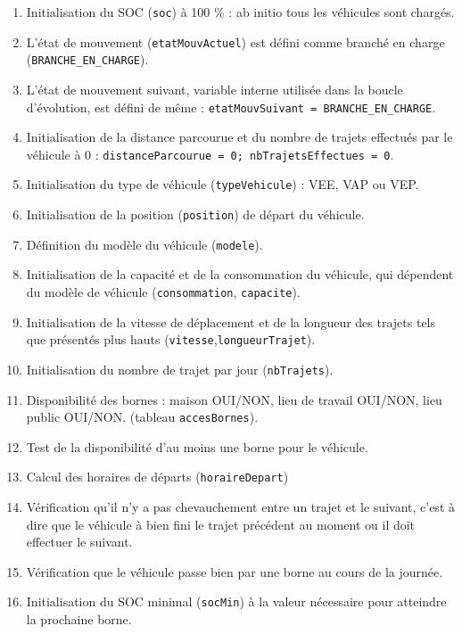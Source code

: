 			\begin{enumerate}
				\item Initialisation du SOC (\texttt{soc}) à 100 $\percent$ : ab initio tous les véhicules sont chargés.
				\item L'état de mouvement (\texttt{etatMouvActuel}) est défini comme branché en charge (\texttt{BRANCHE\_EN\_CHARGE}).
				\item L'état de mouvement suivant, variable interne utilisée dans la boucle d'évolution, est défini de même : \texttt{etatMouvSuivant = BRANCHE\_EN\_CHARGE}.
				\item Initialisation de la distance parcourue et du nombre de trajets effectués par le véhicule à 0 : \texttt{distanceParcourue = 0; nbTrajetsEffectues = 0}.
				\item Initialisation du type de véhicule (\texttt{typeVehicule}) : VEE, VAP ou VEP.
				\item Initialisation de la position (\texttt{position}) de départ du véhicule.
				\item Définition du modèle du véhicule (\texttt{modele}).
				\item Initialisation de la capacité et de la consommation du véhicule, qui dépendent du modèle de véhicule (\texttt{consommation}, \texttt{capacite}).
				\item Initialisation de la vitesse de déplacement et de la longueur des trajets tels que présentés plus hauts (\texttt{vitesse},\texttt{longueurTrajet}).
				\item Initialisation du nombre de trajet par jour (\texttt{nbTrajets}).
				\item Disponibilité des bornes : maison OUI/NON, lieu de travail OUI/NON, lieu public OUI/NON. (tableau \texttt{accesBornes}).
				\item Test de la disponibilité d'au moins une borne pour le véhicule.
				\item Calcul des horaires de départs (\texttt{horaireDepart})
				\item Vérification qu'il n'y a pas chevauchement entre un trajet et le suivant, c'est à dire que le véhicule à bien fini le trajet précédent au moment ou il doit effectuer le suivant.
				\item Vérification que le véhicule passe bien par une borne au cours de la journée.
				\item Initialisation du SOC minimal (\texttt{socMin}) à la valeur nécessaire pour atteindre la prochaine borne.
			\end{enumerate}	
	

